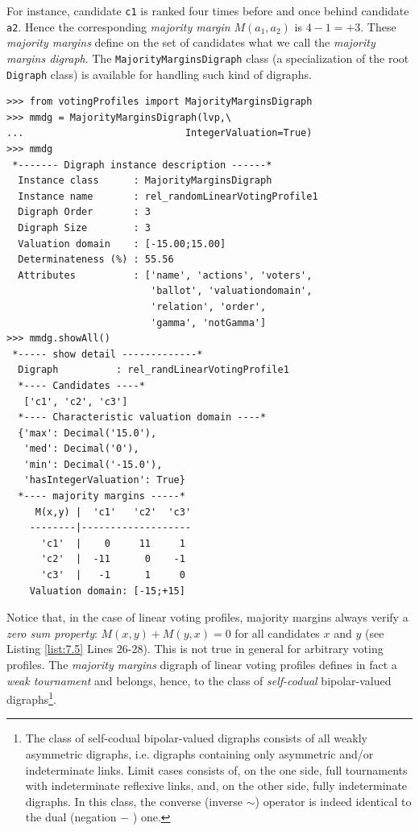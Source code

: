 For instance, candidate \texttt{c1} is ranked four times before and once behind candidate \texttt{a2}. Hence the corresponding \emph{majority margin} $M(a_1,a_2)$ is $4 - 1 = +3$. These \emph{majority margins} define on the set of candidates what we call the \emph{majority margins digraph}. The \texttt{MajorityMarginsDigraph} class (a specialization of the root \texttt{Digraph} class) is available for handling such kind of digraphs.
\begin{lstlisting}[caption={Example of \emph{Majority Margins} digraph},label=list:7.5]
>>> from votingProfiles import MajorityMarginsDigraph
>>> mmdg = MajorityMarginsDigraph(lvp,\
...                            IntegerValuation=True)
>>> mmdg
 *------- Digraph instance description ------*
  Instance class      : MajorityMarginsDigraph
  Instance name       : rel_randomLinearVotingProfile1
  Digraph Order       : 3
  Digraph Size        : 3
  Valuation domain    : [-15.00;15.00]
  Determinateness (%) : 55.56
  Attributes          : ['name', 'actions', 'voters',
                         'ballot', 'valuationdomain',
                         'relation', 'order',
                         'gamma', 'notGamma']
>>> mmdg.showAll()
 *----- show detail -------------*
  Digraph          : rel_randLinearVotingProfile1
  *---- Candidates ----*
   ['c1', 'c2', 'c3']
  *---- Characteristic valuation domain ----*
  {'max': Decimal('15.0'),
   'med': Decimal('0'),
   'min': Decimal('-15.0'),
   'hasIntegerValuation': True}
  *---- majority margins -----*
     M(x,y) |  'c1'   'c2'  'c3'	  
    --------|-------------------
      'c1'  |    0     11     1	 
      'c2'  |  -11      0    -1	 
      'c3'  |   -1      1     0	 
    Valuation domain: [-15;+15]
\end{lstlisting}

Notice that, in the case of linear voting profiles, majority margins always verify a \emph{zero sum property}: $M(x,y) + M(y,x) = 0$ for all candidates $x$ and $y$ (see Listing \ref{list:7.5} Lines 26-28). This is not true in general for arbitrary voting profiles. The \emph{majority margins} digraph of linear voting profiles defines in fact a \emph{weak tournament} and belongs, hence, to the class of \emph{self-codual} bipolar-valued digraphs\footnote{The class of self-codual bipolar-valued digraphs consists of all weakly asymmetric digraphs, i.e. digraphs containing only asymmetric and/or indeterminate links. Limit cases consists of, on the one side, full tournaments with indeterminate reflexive links, and, on the other side, fully indeterminate digraphs. In this class, the converse (inverse $\sim$) operator is indeed identical to the dual (negation $-$ ) one.}.
    
